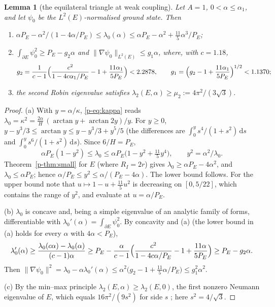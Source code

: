 \documentclass[11pt]{article}
\newtheorem{lemma}[theorem]{Lemma}
\theoremstyle{remark}
\newcommand{\dd}{\,\mathrm{d}}
\begin{document}
\begin{lemma}[the equilateral triangle at weak coupling]\label{p-lem:Eweak}
Let $A=1$, $0<\alpha\le\alpha_1$, and let $\psi_0$ be the $L^2(E)$-normalised ground state. Then
\begin{enumerate}
\item[\textup{(a)}] $\alpha P_E-\alpha^2/(1-4\alpha/P_E)\le\lambda_0(\alpha)\le
\alpha P_E-\alpha^2+\tfrac{11}{5}\alpha^3/P_E$;
\item[\textup{(b)}] $\int_{\partial E}\psi_0^2\ge P_E-g_2\alpha$ and
$\|\nabla\psi_0\|_{L^2(E)}\le g_1\alpha$, where, with $c=1.18$,
\[
  g_2=\frac1{c-1}\Bigl(\frac{c^2}{1-4c\alpha_1/P_E}-1+\frac{11\alpha_1}{5P_E}\Bigr)<2.2878,
  \qquad g_1=\Bigl(g_2-1+\frac{11\alpha_1}{5P_E}\Bigr)^{1/2}<1.1370;
\]
\item[\textup{(c)}] the second Robin eigenvalue satisfies
$\lambda_2(E,\alpha)\ge\mu_2:=4\pi^2/(3\sqrt3)$.
\end{enumerate}
\end{lemma}

\begin{proof}
(a) With $y=\alpha/\kappa$, \eqref{p-eq:kappa} reads
$\lambda_0=\kappa^2=\frac{2\alpha}{H}\,(\arctan y+\arctan2y)/y$. For $y\ge0$,
$y-y^3/3\le\arctan y\le y-y^3/3+y^5/5$ (the differences are $\int_0^ys^4/(1+s^2)\dd s$ and
$\int_0^ys^6/(1+s^2)\dd s$). Since $6/H=P_E$,
\[
  \alpha P_E(1-y^2)\le\lambda_0\le\alpha P_E\bigl(1-y^2+\tfrac{11}{5}y^4\bigr),\qquad
  y^2=\alpha^2/\lambda_0 .
\]
Theorem~\ref{p-thm:small} for $E$ (where $R_I=2r$) gives $\lambda_0\ge\alpha P_E-4\alpha^2$, and
$\lambda_0\le\alpha P_E$; hence $\alpha/P_E\le y^2\le\alpha/(P_E-4\alpha)$. The lower bound
follows. For the upper bound note that $u\mapsto1-u+\frac{11}{5}u^2$ is decreasing on
$[0,5/22]$, which contains the range of $y^2$, and evaluate at $u=\alpha/P_E$.

(b) $\lambda_0$ is concave and, being a simple eigenvalue of an analytic family of forms,
differentiable with $\lambda_0'(\alpha)=\int_{\partial E}\psi_0^2$. By concavity and (a) (the
lower bound in (a) holds for every $\alpha$ with $4\alpha<P_E$),
\[
  \lambda_0'(\alpha)\ge\frac{\lambda_0(c\alpha)-\lambda_0(\alpha)}{(c-1)\alpha}
  \ge P_E-\frac{\alpha}{c-1}\Bigl(\frac{c^2}{1-4c\alpha/P_E}-1+\frac{11\alpha}{5P_E}\Bigr)
  \ge P_E-g_2\alpha .
\]
Then $\|\nabla\psi_0\|^2=\lambda_0-\alpha\lambda_0'(\alpha)\le
\alpha^2\bigl(g_2-1+\tfrac{11}{5}\alpha/P_E\bigr)\le g_1^2\alpha^2$.

(c) By the min--max principle $\lambda_2(E,\alpha)\ge\lambda_2(E,0)$, the first nonzero Neumann
eigenvalue of $E$, which equals $16\pi^2/(9s^2)$ for side $s$ \cite{McCartin2}; here $s^2=4/\sqrt3$.
\end{proof}
\end{document}
